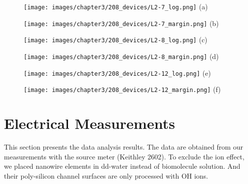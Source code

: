 \begin{figure}[!hbtp]
    \centering
    \begin{minipage}[t][20cm][t]{1\textwidth}
        \begin{minipage}[t]{0.3\textwidth}
            \centering
            \texttt{[image: images/chapter3/208\_devices/L2-7\_log.png]}
            (a)
        \end{minipage}
        \hfill
        \begin{minipage}[t]{0.3\textwidth}
            \centering
            \texttt{[image: images/chapter3/208\_devices/L2-7\_margin.png]}
            (b)
        \end{minipage}
        \vfill
        \begin{minipage}[t]{0.3\textwidth}
            \centering
            \texttt{[image: images/chapter3/208\_devices/L2-8\_log.png]}
            (c)
        \end{minipage}
        \hfill
        \begin{minipage}[t]{0.3\textwidth}
            \centering
            \texttt{[image: images/chapter3/208\_devices/L2-8\_margin.png]}
            (d)
        \end{minipage}
        \vfill
        \begin{minipage}[t]{0.3\textwidth}
            \centering
            \texttt{[image: images/chapter3/208\_devices/L2-12\_log.png]}
            (e)
        \end{minipage}
        \hfill
        \begin{minipage}[t]{0.3\textwidth}
            \centering
            \texttt{[image: images/chapter3/208\_devices/L2-12\_margin.png]}
            (f)
        \end{minipage}

    \end{minipage}
    \caption{}
    \label{fig:SD_Device}
\end{figure}



\section{Electrical Measurements}
This section presents the data analysis results.
The data are obtained from our measurements with the source meter (Keithley 2602).
To exclude the ion effect, we placed nanowire elements in dd-water instead of biomolecule solution.
And their poly-silicon channel surfaces are only processed with {\color{red}OH ions.}

